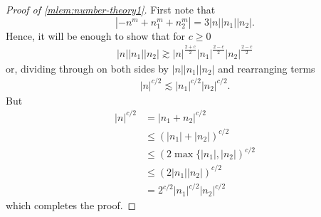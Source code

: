 \begin{proof}[Proof of \cref{mlem:number-theory1}] First note that
%
\begin{equation*}
		| - n^m + n_1^m + n_2^m|
		 = 3 | n | |n_1 | |n_2 |.
\end{equation*}
%
%
Hence, it will be enough to show that for $c \ge 0$
%
%
\begin{equation*}
	\begin{split}
		| n | |n_1 | |n_2 | \gtrsim | n |^{\frac{2 + c}{2}}| n_1
		|^{\frac{2-c}{2}}| n_2 |^{\frac{2-c}{2}}
	\end{split}
\end{equation*}
%
%
or, dividing through on both sides by $|n| | n_1 | | n_2 |$ and rearranging terms
%
%
\begin{equation*}
	\begin{split}
		| n |^{c/2} \lesssim | n_1 |^{c/2} | n_2 |^{c/2}.
	\end{split}
\end{equation*}
%
%
But
%
%
\begin{equation*}
	\begin{split}
		| n |^{c/2} &= | n_1 + n_2 |^{c/2}
		\\
		& \le (| n_1 | + |n_2|)^{c/2} 
		\\
		& \le (2\max\{|
		n_1 |, | n_2 |)^{c/2}
		\\
		& \le (2|
		n_1 | | n_2 |)^{c/2}
		\\
		& = 2^{c/2} | n_1 |^{c/2} | n_2 |^{c/2}
	\end{split}
\end{equation*}
%
which completes the proof. 
\end{proof}
%
%
%
